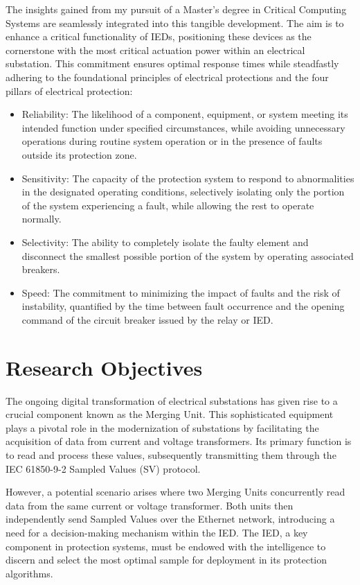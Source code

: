 The insights gained from my pursuit of a Master's degree in Critical Computing Systems are seamlessly integrated into this tangible development. The aim is to enhance a critical functionality of IEDs, positioning these devices as the cornerstone with the most critical actuation power within an electrical substation. This commitment ensures optimal response times while steadfastly adhering to the foundational principles of electrical protections and the four pillars of electrical protection:

\begin{itemize}
	\item Reliability: The likelihood of a component, equipment, or system meeting its intended function under specified circumstances, while avoiding unnecessary operations during routine system operation or in the presence of faults outside its protection zone.
	\item Sensitivity: The capacity of the protection system to respond to abnormalities in the designated operating conditions, selectively isolating only the portion of the system experiencing a fault, while allowing the rest to operate normally.
	\item Selectivity: The ability to completely isolate the faulty element and disconnect the smallest possible portion of the system by operating associated breakers.
	\item Speed: The commitment to minimizing the impact of faults and the risk of instability, quantified by the time between fault occurrence and the opening command of the circuit breaker issued by the relay or IED.
\end{itemize}

\section{Research Objectives}

The ongoing digital transformation of electrical substations has given rise to a crucial component known as the Merging Unit. This sophisticated equipment plays a pivotal role in the modernization of substations by facilitating the acquisition of data from current and voltage transformers. Its primary function is to read and process these values, subsequently transmitting them through the IEC 61850-9-2 Sampled Values (SV) protocol.

However, a potential scenario arises where two Merging Units concurrently read data from the same current or voltage transformer. Both units then independently send Sampled Values over the Ethernet network, introducing a need for a decision-making mechanism within the IED. The IED, a key component in protection systems, must be endowed with the intelligence to discern and select the most optimal sample for deployment in its protection algorithms.

